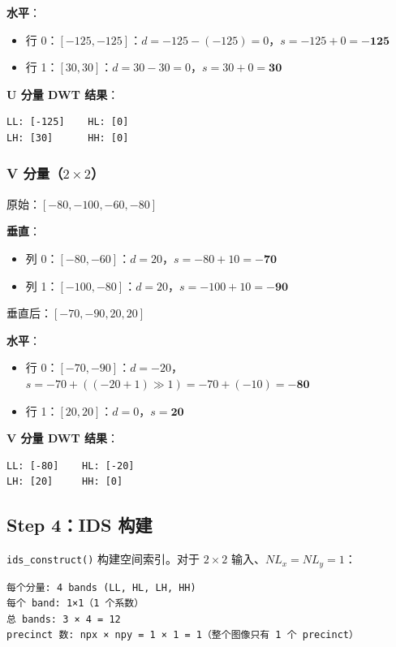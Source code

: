 \textbf{水平}：
\begin{itemize}
  \item 行 0：$[-125, -125]$：$d = -125-(-125) = 0$，$s = -125+0 = \mathbf{-125}$
  \item 行 1：$[30, 30]$：$d = 30-30 = 0$，$s = 30+0 = \mathbf{30}$
\end{itemize}

\textbf{U 分量 DWT 结果}：

\begin{lstlisting}[numbers=none]
LL: [-125]    HL: [0]
LH: [30]      HH: [0]
\end{lstlisting}

\subsubsection{V 分量（$2\times2$）}

原始：$[-80, -100, -60, -80]$

\textbf{垂直}：
\begin{itemize}
  \item 列 0：$[-80, -60]$：$d = 20$，$s = -80 + 10 = \mathbf{-70}$
  \item 列 1：$[-100, -80]$：$d = 20$，$s = -100+10 = \mathbf{-90}$
\end{itemize}
垂直后：$[-70, -90, 20, 20]$

\textbf{水平}：
\begin{itemize}
  \item 行 0：$[-70, -90]$：$d = -20$，$s = -70 + ((-20+1)\gg1) = -70+(-10) = \mathbf{-80}$
  \item 行 1：$[20, 20]$：$d = 0$，$s = \mathbf{20}$
\end{itemize}

\textbf{V 分量 DWT 结果}：

\begin{lstlisting}[numbers=none]
LL: [-80]    HL: [-20]
LH: [20]     HH: [0]
\end{lstlisting}

\subsection{Step 4：IDS 构建}

\texttt{ids\_construct()} 构建空间索引。对于 $2\times2$ 输入、$NL_x=NL_y=1$：

\begin{lstlisting}[numbers=none]
每个分量: 4 bands (LL, HL, LH, HH)
每个 band: 1×1（1 个系数）
总 bands: 3 × 4 = 12
precinct 数: npx × npy = 1 × 1 = 1（整个图像只有 1 个 precinct）
\end{lstlisting}

